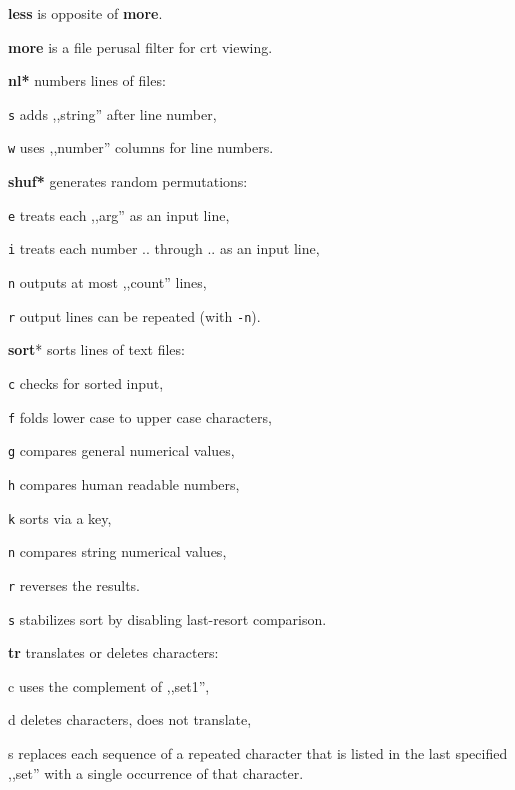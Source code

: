 \begin{enumx}
	\item [\cmd] \textbf{less} is opposite of \textbf{more}.
	\item [\cmd] \textbf{more} is a file perusal filter for crt viewing.
\end{enumx}

\begin{enumx}
	\item [\cmd] \textbf{nl*} numbers lines of files:
	\item [\texttt{s}] adds ,,string'' after line number,
	\item [\texttt{w}] uses ,,number'' columns for line numbers.
\end{enumx}

\begin{enumx}
	\item [\cmd] \textbf{shuf*} generates random permutations:
	\item [\texttt{e}] treats each ,,arg'' as an input line,
	\item [\texttt{i}] treats each number .. through .. as an input line, 
	\item [\texttt{n}] outputs at most ,,count'' lines,
	\item [\texttt{r}] output lines can be repeated (with \texttt{-n}).
\end{enumx}

\begin{enumx}
	\item [\cmd] \textbf{sort}* sorts lines of text files:
	\item [\texttt{c}] checks for sorted input,
	\item [\texttt{f}] folds lower case to upper case characters,
	\item [\texttt{g}] compares general numerical values,
	\item [\texttt{h}] compares human readable numbers,
	\item [\texttt{k}] sorts via a key,
	\item [\texttt{n}] compares string numerical values,
	\item [\texttt{r}] reverses the results.
	\item [\texttt{s}] stabilizes sort by disabling last-resort comparison.
\end{enumx}

\begin{enumx}
	\item [\cmd] \textbf{tr} translates or deletes characters:
	\item [c] uses the complement of ,,set1'',
	\item [d] deletes characters, does not translate,
	\item [s] replaces each sequence of a repeated character that is listed 
	in the last specified ,,set'' with a single occurrence of that character.
\end{enumx}

